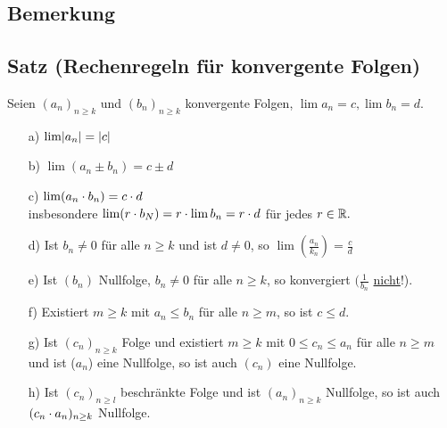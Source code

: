 \subsection{Bemerkung}\label{sec:2.7}
\begin{enumerate}
\item[a)]$(a_n)_{n \geq 1}$ Nullfolge $\Leftrightarrow (\abs{a_n})_{n \geq 1}$ Nullfolge ($\abs{a_n - 0} = \abs{a_n} - \abs{\abs{a_n}-0}}$
\item[b)]$\lim_{n\Rightarrow\infty} a_n = c \Leftrightarrow (a_n -c)_{n \geq k}$ ist Nullfolge $\Leftrightarrow (\abs{a_n -c})_{n \geq k}$ ist Nullfolge
\end{enumerate}
\subsection{Satz (Rechenregeln f\"ur konvergente Folgen)}\label{sec:2.8}
Seien $(a_n)_{n \geq k}$ und $(b_n)_{n \geq k}$ konvergente Folgen, $\lim a_n = c, \lim b_n = d.$\\
\begin{enumerate}
\item[a)]$\lim \abs{a_n} = \abs{c}$
\item[b)]$\lim (a_n \pm b_n) = c \pm d$
\item[c)]$\lim (a_n \cd b_n) = c \cd d$\\
insbesondere $\lim(r \cd b_N) = r \cd \lim b_n = r \cd d$ f\"ur jedes $r \in \R.$
\item[d)]Ist $b_n \not = 0$ f\"ur alle $n \geq k$ und ist $ d \not = 0$, so $\lim (\frac{a_n}{k_n}) = \frac{c}{d}$
\item[e)]Ist $(b_n)$ Nullfolge, $b_n \not = 0$ f\"ur alle $n \geq k$, so konvergiert $(\frac{1}{b_n}$ \underline{nicht}!).
\item[f)]Existiert $m \geq k$ mit $a_n \leq b_n$ f\"ur alle $n \geq m$, so ist $c \leq d$.
\item[g)] Ist $(c_n)_{n \geq k}$ Folge und existiert $ m \geq k$ mit $0 \leq c_n \leq a_n$ f\"ur alle $n \geq m$ und ist ($a_n$) eine Nullfolge, so ist auch $(c_n)$ eine Nullfolge.
\item[h)]Ist $(c_n)_{n \geq l}$ beschr\"ankte Folge und ist $(a_n)_{n \geq k}$ Nullfolge, so ist auch $(c_n \cd a_n)_{n \geq k}$ Nullfolge.\\
\end{enumerate}
